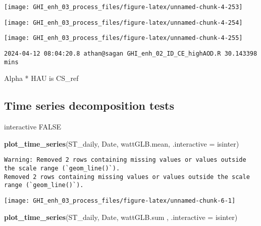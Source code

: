 \documentclass[
  10pt,
  a4paper,oneside]{article}
\newenvironment{Shaded}{\begin{snugshade}}{\end{snugshade}}
\newcommand{\AttributeTok}[1]{\textcolor[rgb]{0.13,0.29,0.53}{#1}}
\newcommand{\FunctionTok}[1]{\textcolor[rgb]{0.13,0.29,0.53}{\textbf{#1}}}
\newcommand{\NormalTok}[1]{#1}
\begin{document}
\begin{center}\texttt{[image: GHI\_enh\_03\_process\_files/figure-latex/unnamed-chunk-4-253]} \end{center}

\begin{center}\texttt{[image: GHI\_enh\_03\_process\_files/figure-latex/unnamed-chunk-4-254]} \end{center}

\begin{center}\texttt{[image: GHI\_enh\_03\_process\_files/figure-latex/unnamed-chunk-4-255]} \end{center}

\begin{verbatim}
2024-04-12 08:04:20.8 athan@sagan GHI_enh_02_ID_CE_highAOD.R 30.143398 mins
\end{verbatim}

Alpha * HAU is CS\_ref

\hypertarget{time-series-decomposition-tests}{%
\subsection{Time series decomposition tests}\label{time-series-decomposition-tests}}

interactive FALSE

\begin{Shaded}
\begin{Highlighting}[]
\FunctionTok{plot\_time\_series}\NormalTok{(ST\_daily, Date, wattGLB.mean, }\AttributeTok{.interactive =}\NormalTok{ isinter)}
\end{Highlighting}
\end{Shaded}

\begin{verbatim}
Warning: Removed 2 rows containing missing values or values outside the scale range (`geom_line()`).
Removed 2 rows containing missing values or values outside the scale range (`geom_line()`).
\end{verbatim}

\begin{center}\texttt{[image: GHI\_enh\_03\_process\_files/figure-latex/unnamed-chunk-6-1]} \end{center}

\begin{Shaded}
\begin{Highlighting}[]
\FunctionTok{plot\_time\_series}\NormalTok{(ST\_daily, Date, wattGLB.sum , }\AttributeTok{.interactive =}\NormalTok{ isinter)}
\end{Highlighting}
\end{Shaded}
\end{document}
